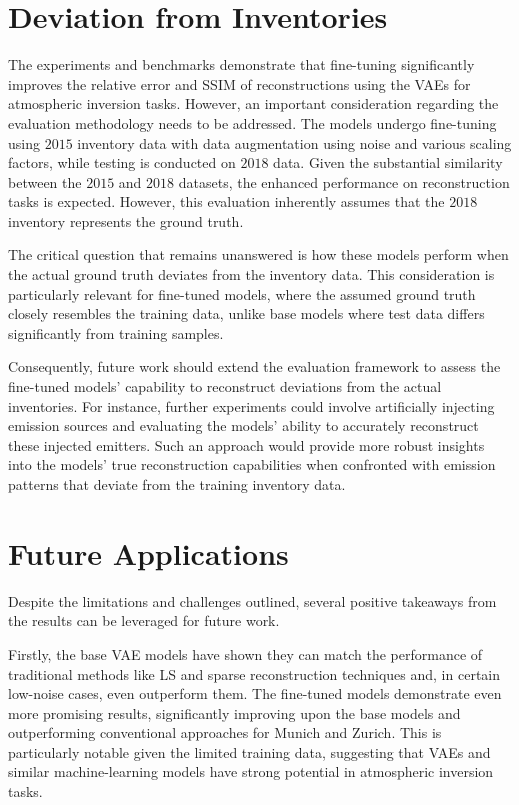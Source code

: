 \section{Deviation from Inventories}

The experiments and benchmarks demonstrate that fine-tuning significantly improves the relative error and \gls{SSIM} of reconstructions using the \gls{VAE}s for atmospheric inversion tasks.
However, an important consideration regarding the evaluation methodology needs to be addressed.
The models undergo fine-tuning using $2015$ inventory data with data augmentation using noise and various scaling factors, while testing is conducted on $2018$ data.
Given the substantial similarity between the $2015$ and $2018$ datasets, the enhanced performance on reconstruction tasks is expected.
However, this evaluation inherently assumes that the $2018$ inventory represents the ground truth.

The critical question that remains unanswered is how these models perform when the actual ground truth deviates from the inventory data.
This consideration is particularly relevant for fine-tuned models, where the assumed ground truth closely resembles the training data, unlike base models where test data differs significantly from training samples.

Consequently, future work should extend the evaluation framework to assess the fine-tuned models' capability to reconstruct deviations from the actual inventories.
For instance, further experiments could involve artificially injecting emission sources and evaluating the models' ability to accurately reconstruct these injected emitters.
Such an approach would provide more robust insights into the models' true reconstruction capabilities when confronted with emission patterns that deviate from the training inventory data.

\section{Future Applications}
Despite the limitations and challenges outlined, several positive takeaways from the results can be leveraged for future work.

Firstly, the base \gls{VAE} models have shown they can match the performance of traditional methods like \gls{LS} and sparse reconstruction techniques and, in certain low-noise cases, even outperform them.
The fine-tuned models demonstrate even more promising results, significantly improving upon the base models and outperforming conventional approaches for Munich and Zurich.
This is particularly notable given the limited training data, suggesting that \gls{VAE}s and similar machine-learning models have strong potential in atmospheric inversion tasks.

